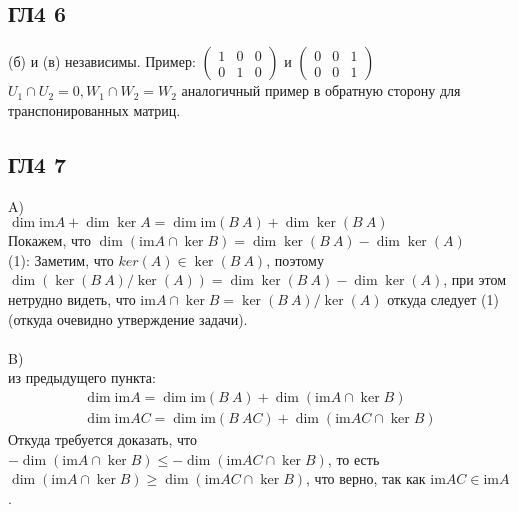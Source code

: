 		\subsection{ГЛ4 6}
		(б) и (в) независимы. Пример:
		$\begin{pmatrix}
			1 & 0 & 0\\ 0 & 1 & 0 
		\end{pmatrix}$
		и
		$\begin{pmatrix}
			0 & 0 & 1\\
			0 & 0 & 1
		\end{pmatrix}$\\
		$U_1 \cap U_2 = 0, W_1 \cap W_2 = W_2$
		аналогичный пример в обратную сторону для транспонированных матриц.
		
		\subsection{ГЛ4 7}
		A)\\
		$\dim\text{im} A + \dim \ker A = \dim\text{im} (B\ A) + \dim \ker (B\ A)$\\
		Покажем, что $\dim (\text{im} A \cap \ker B) = \dim \ker (B\ A) - \dim \ker (A)$\\
		(1): Заметим, что $ker (A) \in \ker (B\ A)$, поэтому $\dim ( \ker (B\ A) / \ker (A) ) = \dim \ker (B\ A) - \dim \ker (A)$, при этом нетрудно видеть, что $\text{im} A \cap \ker B = \ker (B\ A) / \ker (A)$ откуда следует (1) (откуда очевидно утверждение задачи).\\
		\\
		B)\\
		из предыдущего пункта:\\
		\begin{gather*}
			\dim\text{im} A = \dim\text{im} (B\ A) + \dim (\text{im} A \cap \ker B)\\
			\dim\text{im} AC = \dim\text{im} (B\ AC) + \dim (\text{im} AC \cap \ker B)
		\end{gather*}
		Откуда требуется доказать, что\\
		$ - \dim (\text{im} A \cap \ker B) \leq - \dim (\text{im} AC \cap \ker B)$, то есть $ \dim (\text{im} A \cap \ker B) \geq  \dim (\text{im} AC \cap \ker B)$, что верно, так как $\text{im} AC \in\text{im} A$.\\
		
		
